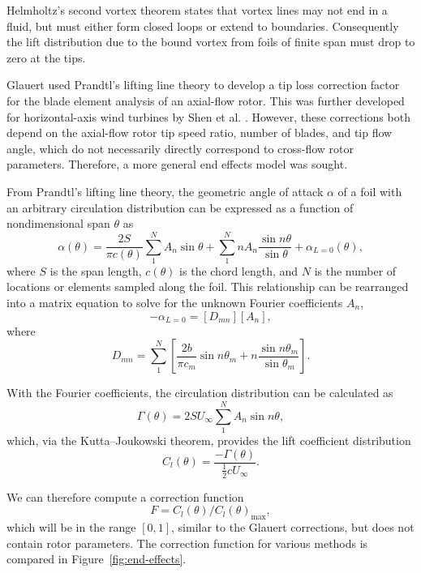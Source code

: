 Helmholtz's second vortex theorem states that vortex lines may not end in a
fluid, but must either form closed loops or extend to boundaries. Consequently
the lift distribution due to the bound vortex from foils of finite span must
drop to zero at the tips.

Glauert used Prandtl's lifting line theory to develop a tip loss correction
factor for the blade element analysis of an axial-flow rotor. This was further
developed for horizontal-axis wind turbines by Shen et al. \cite{Shen2005a}.
However, these corrections both depend on the axial-flow rotor tip speed ratio,
number of blades, and tip flow angle, which do not necessarily directly
correspond to cross-flow rotor parameters. Therefore, a more general end effects
model was sought.

From Prandtl's lifting line theory, the geometric angle of attack $\alpha$ of a
foil with an arbitrary circulation distribution can be expressed as a function
of nondimensional span $\theta$ as \cite{Anderson2001}
\begin{equation}
    \alpha (\theta) = \frac{2S}{\pi c (\theta)}
    \sum_1^N A_n \sin \theta
    + \sum_1^N n A_n \frac{\sin n \theta}{\sin \theta}
    + \alpha_{L = 0}(\theta),
    \label{eq:lifting-line}
\end{equation}
where $S$ is the span length, $c(\theta)$ is the chord length, and $N$ is the
number of locations or elements sampled along the foil. This relationship can be
rearranged into a matrix equation to solve for the unknown Fourier coefficients
$A_n$,
\begin{equation}
    [\alpha_m ] - \alpha_{L=0} = [D_{mn}][A_n],
\end{equation}
where
\begin{equation}
    D_{mn} = \sum_1^N \left[ \frac{2b}{\pi c_m} \sin n \theta_m + n \frac{\sin n
        \theta_m}{\sin \theta_m} \right].
\end{equation}

With the Fourier coefficients, the circulation distribution can be calculated as
\begin{equation}
    \Gamma (\theta) = 2SU_\infty \sum_1^N A_n \sin n \theta,
\end{equation}
which, via the Kutta--Joukowski theorem, provides the lift coefficient
distribution
\begin{equation}
    C_l(\theta) = \frac{-\Gamma (\theta)}{\frac{1}{2} c U_\infty}.
\end{equation}

We can therefore compute a correction function 
\begin{equation}
    F = C_l(\theta)/C_l(\theta)_{\max},
\end{equation}
which will be in the range $[0, 1]$, similar to the Glauert corrections, but
does not contain rotor parameters. The correction function for various methods
is compared in Figure~\ref{fig:end-effects}.

